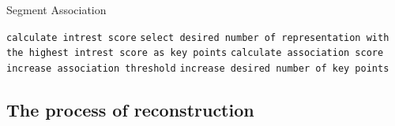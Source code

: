 \begin{algorithm}
\caption{Segment Association}\label{alg:assoc}
\begin{algorithmic}
        \State \texttt{calculate intrest score}
    \EndFor
    \State \texttt{select desired number of representation with the highest intrest score as key points}
            \State \texttt{calculate association score}
            \EndIf
        \EndFor
    \EndFor
    \State \texttt{increase association threshold}
    \State \texttt{increase desired number of key points}
\EndWhile
\end{algorithmic}
\end{algorithm}

\subsection{The process of reconstruction} %


